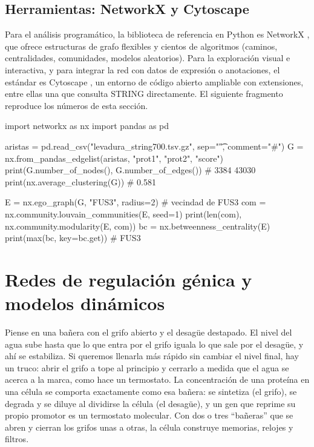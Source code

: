 \subsection{Herramientas: NetworkX y Cytoscape}

Para el análisis programático, la biblioteca de referencia en Python es NetworkX \parencite{c16-hagberg2008}, que ofrece estructuras de grafo flexibles y cientos de algoritmos (caminos, centralidades, comunidades, modelos aleatorios). Para la exploración visual e interactiva, y para integrar la red con datos de expresión o anotaciones, el estándar es Cytoscape \parencite{c16-shannon2003}, un entorno de código abierto ampliable con extensiones, entre ellas una que consulta STRING directamente. El siguiente fragmento reproduce los números de esta sección.

\begin{codigo}
import networkx as nx
import pandas as pd

aristas = pd.read_csv("levadura_string700.tsv.gz", sep="\t",
                      comment="#")
G = nx.from_pandas_edgelist(aristas, "prot1", "prot2", "score")
print(G.number_of_nodes(), G.number_of_edges())   # 3384 43030
print(nx.average_clustering(G))                   # 0.581

E = nx.ego_graph(G, "FUS3", radius=2)             # vecindad de FUS3
com = nx.community.louvain_communities(E, seed=1)
print(len(com), nx.community.modularity(E, com))
bc = nx.betweenness_centrality(E)
print(max(bc, key=bc.get))                        # FUS3
\end{codigo}

\section{Redes de regulación génica y modelos dinámicos}\label{sec:16-grn}

\begin{intuicion}
Piense en una bañera con el grifo abierto y el desagüe destapado. El nivel del agua sube hasta que lo que entra por el grifo iguala lo que sale por el desagüe, y ahí se estabiliza. Si queremos llenarla más rápido sin cambiar el nivel final, hay un truco: abrir el grifo a tope al principio y cerrarlo a medida que el agua se acerca a la marca, como hace un termostato. La concentración de una proteína en una célula se comporta exactamente como esa bañera: se sintetiza (el grifo), se degrada y se diluye al dividirse la célula (el desagüe), y un gen que reprime su propio promotor es un termostato molecular. Con dos o tres ``bañeras'' que se abren y cierran los grifos unas a otras, la célula construye memorias, relojes y filtros.
\end{intuicion}

